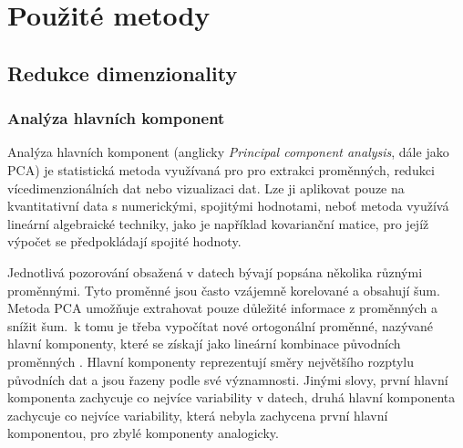 \chapter{Použité metody}


\section{}


\section{Redukce dimenzionality} %

\subsection{Analýza hlavních komponent}


Analýza hlavních komponent (anglicky \emph{Principal component analysis}, dále jako PCA) je statistická metoda využívaná pro pro extrakci proměnných, redukci vícedimenzionálních dat nebo vizualizaci dat. Lze ji aplikovat pouze na kvantitativní data s numerickými, spojitými hodnotami, neboť metoda využívá lineární algebraické techniky, jako je například kovarianční matice, pro jejíž výpočet se předpokládají spojité hodnoty. 

Jednotlivá pozorování obsažená v datech bývají popsána několika různými proměnnými. Tyto proměnné jsou často vzájemně korelované a obsahují šum. Metoda PCA umožňuje extrahovat pouze důležité informace z proměnných a snížit šum.~k tomu je třeba vypočítat nové ortogonální proměnné, nazývané hlavní komponenty, které se získají jako lineární kombinace původních proměnných \cite{bib:PCA1}. Hlavní komponenty reprezentují směry největšího rozptylu původních dat a jsou řazeny podle své významnosti. Jinými slovy, první hlavní komponenta zachycuje co nejvíce variability v datech, druhá hlavní komponenta zachycuje co nejvíce variability, která nebyla zachycena první hlavní komponentou, pro zbylé komponenty analogicky. 

